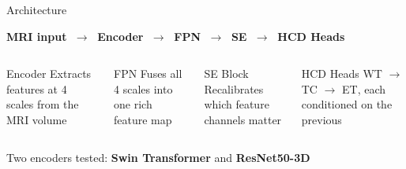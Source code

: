 \documentclass[aspectratio=169]{beamer}
\begin{document}
\begin{frame}{Architecture}
  \vspace{0.5em}
  \begin{center}
  \large
  \textbf{MRI input}
  $\;\longrightarrow\;$
  \textcolor{encblue}{\textbf{Encoder}}
  $\;\longrightarrow\;$
  \textcolor{fpngreen}{\textbf{FPN}}
  $\;\longrightarrow\;$
  \textcolor{seorange}{\textbf{SE}}
  $\;\longrightarrow\;$
  \textbf{HCD Heads}
  \end{center}

  \vspace{1.2em}
  \begin{columns}
      \begin{block}{\textcolor{encblue}{Encoder}}
        \small Extracts features at 4 scales from the MRI volume
      \end{block}
      \begin{block}{\textcolor{fpngreen}{FPN}}
        \small Fuses all 4 scales into one rich feature map
      \end{block}
      \begin{block}{\textcolor{seorange}{SE Block}}
        \small Recalibrates which feature channels matter
      \end{block}
      \begin{block}{HCD Heads}
        \small WT $\to$ TC $\to$ ET, each conditioned on the previous
      \end{block}
  \end{columns}

  \vspace{1em}
  \begin{center}
    Two encoders tested: \textbf{Swin Transformer} and \textbf{ResNet50-3D}
  \end{center}
\end{frame}
\end{document}
